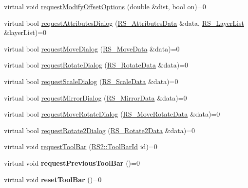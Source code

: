 \begin{DoxyCompactItemize}
\item 
virtual void \hyperlink{classRS__DialogFactoryInterface_aca9548ff503740edd2473b5e9732b98a}{request\-Modify\-Offset\-Options} (double \&dist, bool on)=0
\item 
virtual bool \hyperlink{classRS__DialogFactoryInterface_a7294139615bde9a052971083ef808ee7}{request\-Attributes\-Dialog} (\hyperlink{classRS__AttributesData}{R\-S\-\_\-\-Attributes\-Data} \&data, \hyperlink{classRS__LayerList}{R\-S\-\_\-\-Layer\-List} \&layer\-List)=0
\item 
virtual bool \hyperlink{classRS__DialogFactoryInterface_a84809c4af458f1ec63bdf8e7cfde8a02}{request\-Move\-Dialog} (\hyperlink{classRS__MoveData}{R\-S\-\_\-\-Move\-Data} \&data)=0
\item 
virtual bool \hyperlink{classRS__DialogFactoryInterface_a4196686ece4a4a0a0c813b47daa43cc5}{request\-Rotate\-Dialog} (\hyperlink{classRS__RotateData}{R\-S\-\_\-\-Rotate\-Data} \&data)=0
\item 
virtual bool \hyperlink{classRS__DialogFactoryInterface_ab2170e70be6fc9846a5d0628600b7e2c}{request\-Scale\-Dialog} (\hyperlink{classRS__ScaleData}{R\-S\-\_\-\-Scale\-Data} \&data)=0
\item 
virtual bool \hyperlink{classRS__DialogFactoryInterface_a9051595c6f23c2c4efaf2900a4f282dd}{request\-Mirror\-Dialog} (\hyperlink{classRS__MirrorData}{R\-S\-\_\-\-Mirror\-Data} \&data)=0
\item 
virtual bool \hyperlink{classRS__DialogFactoryInterface_acc71995e7165cc9c7eb4ef215e7b68c2}{request\-Move\-Rotate\-Dialog} (\hyperlink{classRS__MoveRotateData}{R\-S\-\_\-\-Move\-Rotate\-Data} \&data)=0
\item 
virtual bool \hyperlink{classRS__DialogFactoryInterface_aec13bccf53c82ce95bc4f619c4e45501}{request\-Rotate2\-Dialog} (\hyperlink{classRS__Rotate2Data}{R\-S\-\_\-\-Rotate2\-Data} \&data)=0
\item 
virtual void \hyperlink{classRS__DialogFactoryInterface_a7528e6a77554fcd2873d6eb9e03402ab}{request\-Tool\-Bar} (\hyperlink{classRS2_a53db3c150d1d8d501b236d537de53793}{R\-S2\-::\-Tool\-Bar\-Id} id)=0
\item 
\hypertarget{classRS__DialogFactoryInterface_ab6f34c399a04e799544bfe11b599ae83}{virtual void {\bfseries request\-Previous\-Tool\-Bar} ()=0}\label{classRS__DialogFactoryInterface_ab6f34c399a04e799544bfe11b599ae83}

\item 
\hypertarget{classRS__DialogFactoryInterface_ab2743a2cf19bee36c9ea7c77afaf3cc1}{virtual void {\bfseries reset\-Tool\-Bar} ()=0}\label{classRS__DialogFactoryInterface_ab2743a2cf19bee36c9ea7c77afaf3cc1}


\end{DoxyCompactItemize}
